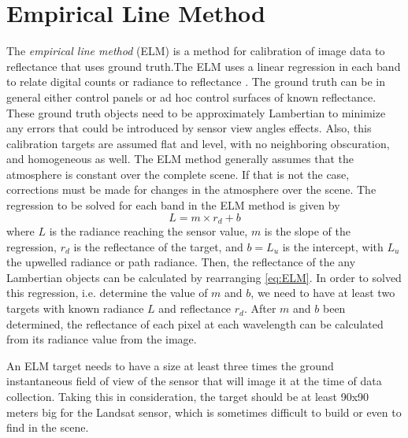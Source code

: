 \section{ Empirical Line Method}
\label{subsec:ELM}
The {\it empirical line method} (ELM) is a method for calibration of image data to reflectance that uses ground truth.The ELM uses a linear regression in each band to relate digital counts or radiance to reflectance \cite{Schott}. The ground truth can be in general  either control panels or ad hoc control surfaces of known reflectance. These ground truth objects need to be approximately Lambertian to minimize any errors that could be introduced by sensor view angles effects. Also, this calibration targets are assumed flat and level, with no neighboring obscuration, and homogeneous as well. The ELM method generally assumes that the atmosphere is constant over the complete scene. If that is not the case, corrections must be made for changes in the atmosphere over the scene. The regression to be solved for each band in the ELM method is given by
\begin{equation}
	\label{eq:ELM} 
	L = m\times r_d + b
\end{equation}
where $L$ is the radiance reaching the sensor value, $m$ is the slope of the regression, $r_d$ is the reflectance of the target, and $b=L_u$ is the intercept, with $L_u$ the upwelled radiance or path radiance. Then, the reflectance of the any Lambertian objects can be calculated by rearranging \autoref{eq:ELM}. In order to solved this regression, i.e. determine the value of $m$ and $b$, we need to have at least two targets with known radiance $L$ and reflectance $r_d$. After $m$ and $b$ been determined, the reflectance of each pixel at each wavelength can be calculated from its radiance value from the image.

An ELM target needs to have a size at least three times the ground instantaneous field of view of the sensor that will image it at the time of data collection. Taking this in consideration, the target should be at least 90x90 meters big for the Landsat sensor, which is sometimes difficult to build or even to find in the scene. 



